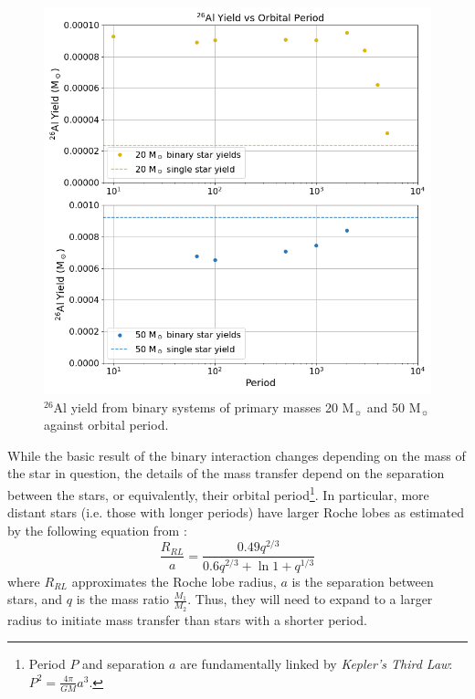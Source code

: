 \begin{figure}
    \centering
    \includegraphics[width=\columnwidth]{figures/results1/fig_YieldvsPeriod.png}
    \captionsetup{width=\columnwidth}
    \caption{$^{26}$Al yield from binary systems of primary masses 20 M$_{\sun}$ and 50 M$_{\sun}$ against orbital period.}
    \label{fig:Period}
\end{figure}

While the basic result of the binary interaction changes depending on the mass of the star in question, the details of the mass transfer depend on the separation between the stars, or equivalently, their orbital period\footnote{Period $P$ and separation $a$ are fundamentally linked by \textit{Kepler's Third Law}: $P^2 = \frac{4\pi}{GM}a^3$.}.
In particular, more distant stars (i.e. those with longer periods) have larger Roche lobes as estimated by the following equation from \cite{1983ApJ...268..368E}:
\begin{equation}
    \frac{R_{RL}}{a}=\frac{0.49q^{2/3}}{0.6q^{2/3}+\ln{1+q^{1/3}}}
\end{equation}
where $R_{RL}$ approximates the Roche lobe radius, $a$ is the separation between stars, and $q$ is the mass ratio $\frac{M_1}{M_2}$.
Thus, they will need to expand to a larger radius to initiate mass transfer than stars with a shorter period.

